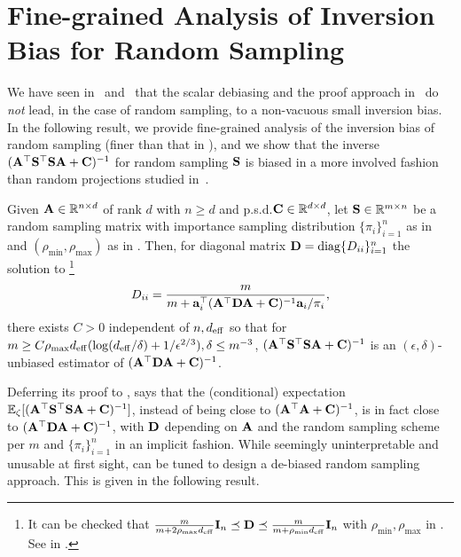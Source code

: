 \documentclass[11pt,a4paper]{article}
\begin{document}
\section{Fine-grained Analysis of Inversion Bias for Random Sampling}
\label{sec:main}

We have seen in ~and~ that the scalar debiasing and the proof approach in~\citet{derezinski2021newtonless,derezinski2021sparse} do \emph{not} lead, in the case of random sampling, to a non-vacuous small inversion bias.
In the following result, we provide fine-grained analysis of the inversion bias of random sampling (finer than that in ), and we show that the inverse $(\A^\top \S^\top\S \A + \C)^{-1}$ for random sampling $\S$ is biased in a more involved fashion than random projections studied in~\citet{derezinski2021newtonless,derezinski2021sparse}.

\begin{theorem}
\label{theo:inverse-bias}
Given $\A\in \RR^{n\times d}$ of rank $d$ with $n \geq d$ and p.s.d.\@ $\C\in \RR^{d\times d}$, let $\S \in \RR^{m \times n}$ be a random sampling  matrix with importance sampling distribution $\{ \pi_i \}_{i=1}^n$ as in  and $(\rho_{\min}, \rho_{\max})$ as in .
Then, for diagonal matrix $\D = \diag\{ D_{ii} \}_{i=1}^n$ the solution to%
\footnote{ It can be checked that $\frac{m}{m+2\rho_{\max}  d_{\eff}}\I_n \preceq \D \preceq \frac{m}{m+\rho_{\min} d_{\eff}}\I_n$ with $\rho_{\min}, \rho_{\max}$ in . See  in .\label{footnote:D}}
\begin{equation}\label{eq:def_Dii}
    D_{ii} = \frac{m}{ m + \ba_i^\top (\A^\top \D \A + \C)^{-1} \ba_i/\pi_i},
\end{equation}
there exists $C > 0$ independent of $n,d_{\eff}$ so that for $m\geq C\rho_{\max} d_{\eff}(\log(d_{\eff}/\delta )+ 1/\epsilon^{2/3}), \delta\leq m^{-3}$, $(\A^\top \S^\top\S \A + \C )^{-1} $ is an $(\epsilon,\delta)$-unbiased estimator of $(\A^\top \D \A + \C)^{-1}$.
\end{theorem}
Deferring its proof to ,  says that the (conditional) expectation $\EE_{\zeta}[ (\A^\top \S^\top\S \A + \C )^{-1} ]$, instead of being close to $(\A^\top \A + \C)^{-1}$, is in fact close to $(\A^\top \D \A + \C)^{-1}$, with $\D$ depending on $\A$ and the random sampling scheme per $m$ and $\{ \pi_i \}_{i=1}^n$ in an implicit fashion.
While seemingly uninterpretable and unusable at first sight,  can be tuned to design a de-biased random sampling approach.
This is given in the following result. 
\end{document}
